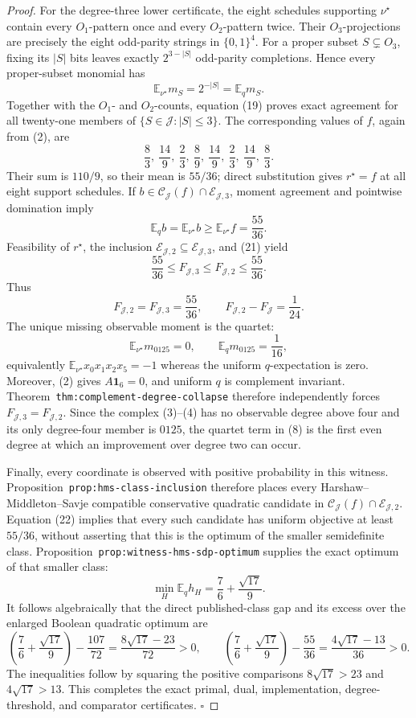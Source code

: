 \documentclass{article}
\begin{document}
\begin{proof}
For the degree-three lower certificate, the eight schedules supporting \(\nu^\star\) contain every \(O_1\)-pattern once and every \(O_2\)-pattern twice.  Their \(O_3\)-projections are precisely the eight odd-parity strings in \(\{0,1\}^4\).  For a proper subset \(S\subsetneq O_3\), fixing its \(|S|\) bits leaves exactly \(2^{3-|S|}\) odd-parity completions.  Hence every proper-subset monomial has
\[
\mathbb E_{\nu^\star}m_S=2^{-|S|}=\mathbb E_qm_S.
\tag{19}
\]
Together with the \(O_1\)- and \(O_2\)-counts, equation (19) proves exact agreement for all twenty-one members of \(\{S\in\mathcal J:|S|\le3\}\).  The corresponding values of \(f\), again from (2), are
\[
\frac83,\ \frac{14}{9},\ \frac23,\ \frac89,
\ \frac{14}{9},\ \frac23,\ \frac{14}{9},\ \frac83.
\tag{20}
\]
Their sum is \(110/9\), so their mean is \(55/36\); direct substitution gives \(r^\star=f\) at all eight support schedules.  If \(b\in\mathcal C_{\mathcal J}(f)\cap\mathcal E_{\mathcal J,3}\), moment agreement and pointwise domination imply
\[
\mathbb E_qb=\mathbb E_{\nu^\star}b
\ge\mathbb E_{\nu^\star}f=\frac{55}{36}.
\tag{21}
\]
Feasibility of \(r^\star\), the inclusion \(\mathcal E_{\mathcal J,2}\subseteq\mathcal E_{\mathcal J,3}\), and (21) yield
\[
\frac{55}{36}\le F_{\mathcal J,3}
\le F_{\mathcal J,2}
\le\frac{55}{36}.
\tag{22}
\]
Thus
\[
F_{\mathcal J,2}=F_{\mathcal J,3}=\frac{55}{36},
\qquad
F_{\mathcal J,2}-F_{\mathcal J}=\frac1{24}.
\tag{23}
\]
The unique missing observable moment is the quartet:
\[
\mathbb E_{\nu^\star}m_{0125}=0,
\qquad
\mathbb E_qm_{0125}=\frac1{16},
\tag{24}
\]
equivalently \(\mathbb E_{\nu^\star}x_0x_1x_2x_5=-1\) whereas the uniform \(q\)-expectation is zero.  Moreover, (2) gives \(A\mathbf 1_6=0\), and uniform \(q\) is complement invariant.  Theorem~\texttt{thm:complement-degree-collapse} therefore independently forces \(F_{\mathcal J,3}=F_{\mathcal J,2}\).  Since the complex (3)--(4) has no observable degree above four and its only degree-four member is \(0125\), the quartet term in (8) is the first even degree at which an improvement over degree two can occur.

Finally, every coordinate is observed with positive probability in this witness.  Proposition~\texttt{prop:hms-class-inclusion} therefore places every Harshaw--Middleton--Savje compatible conservative quadratic candidate in \(\mathcal C_{\mathcal J}(f)\cap\mathcal E_{\mathcal J,2}\).  Equation (22) implies that every such candidate has uniform objective at least \(55/36\), without asserting that this is the optimum of the smaller semidefinite class.  Proposition~\texttt{prop:witness-hms-sdp-optimum} supplies the exact optimum of that smaller class:
\[
\min_H\mathbb E_qh_H
=\frac76+\frac{\sqrt{17}}9.
\tag{25}
\]
It follows algebraically that the direct published-class gap and its excess over the enlarged Boolean quadratic optimum are
\[
\left(\frac76+\frac{\sqrt{17}}9\right)-\frac{107}{72}
=\frac{8\sqrt{17}-23}{72}>0,
\qquad
\left(\frac76+\frac{\sqrt{17}}9\right)-\frac{55}{36}
=\frac{4\sqrt{17}-13}{36}>0.
\tag{26}
\]
The inequalities follow by squaring the positive comparisons \(8\sqrt{17}>23\) and \(4\sqrt{17}>13\).  This completes the exact primal, dual, implementation, degree-threshold, and comparator certificates. \(\square\)
\end{proof}
\end{document}
